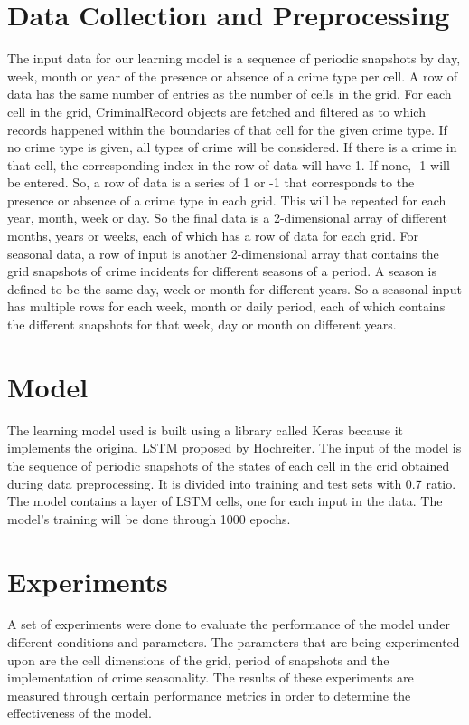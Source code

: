 \section{Data Collection and Preprocessing}
    The input data for our learning model is a sequence of periodic snapshots by day, week, month or year of the presence or absence of a crime type per cell. A row of data has the same number of entries as the number of cells in the grid. For each cell in the grid, CriminalRecord objects are fetched and filtered as to which records happened within the boundaries of that cell for the given crime type. If no crime type is given, all types of crime will be considered. If there is a crime in that cell, the corresponding index in the row of data will have 1. If none, -1 will be entered. So, a row of data is a series of 1 or -1 that corresponds to the presence or absence of a crime type in each grid. This will be repeated for each year, month, week or day. So the final data is a 2-dimensional array of different months, years or weeks, each of which has a row of data for each grid.
    For seasonal data, a row of input is another 2-dimensional array that contains the grid snapshots of crime incidents for different seasons of a period. A season is defined to be the same day, week or month for different years. So a seasonal input has multiple rows for each week, month or daily period, each of which contains the different snapshots for that week, day or month on different years.

\section{Model}
    The learning model used is built using a library called Keras because it implements the original LSTM proposed by Hochreiter. The input of the model is the sequence of periodic snapshots of the states of each cell in the crid obtained during data preprocessing. It is divided into training and test sets with 0.7 ratio. The model contains a layer of LSTM cells, one for each input in the data. The model's training will be done through 1000 epochs.

\section{Experiments}
    A set of experiments were done to evaluate the performance of the model under different conditions and parameters. The parameters that are being experimented upon are the cell dimensions of the grid, period of snapshots and the implementation of crime seasonality. The results of these experiments are measured through certain performance metrics in order to determine the effectiveness of the model.

